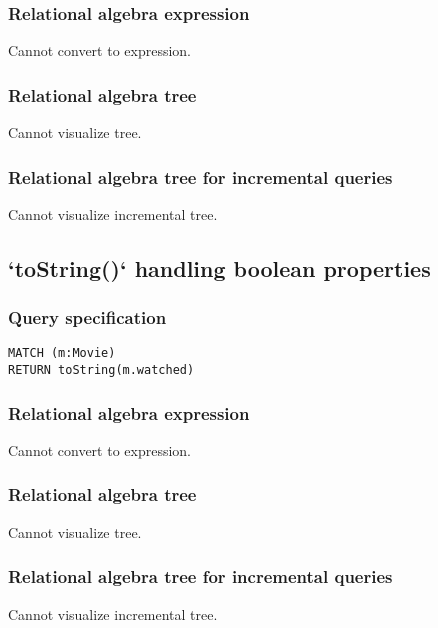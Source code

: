 \subsubsection*{Relational algebra expression}

Cannot convert to expression.

\subsubsection*{Relational algebra tree}

Cannot visualize tree.

\subsubsection*{Relational algebra tree for incremental queries}

Cannot visualize incremental tree.

\subsection{`toString()` handling boolean properties}

\subsubsection*{Query specification}

\begin{lstlisting}
MATCH (m:Movie)
RETURN toString(m.watched)
\end{lstlisting}

\subsubsection*{Relational algebra expression}

Cannot convert to expression.

\subsubsection*{Relational algebra tree}

Cannot visualize tree.

\subsubsection*{Relational algebra tree for incremental queries}

Cannot visualize incremental tree.

